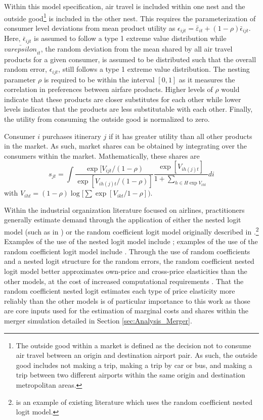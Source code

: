 \documentclass{article}
\begin{document}
    Within this model specification, air travel is included within one nest and the outside good\footnote{The outside good within a market is defined as the decision not to consume air travel between an origin and destination airport pair. As such, the outside good includes not making a trip, making a trip by car or bus, and making a trip between two different airports within the same origin and destination metropolitan areas.} is included in the other nest. This requires the parameterization of consumer level deviations from mean product utility as $\epsilon_{ijt} = \bar{\varepsilon}_{it} + (1-\rho) \bar{\epsilon}_{ijt}$. Here, $\bar{\epsilon}_{ijt}$ is assumed to follow a type 1 extreme value distribution while $\bar{varepsilon}_{it}$,  the random deviation from the mean shared by all air travel products for a given consumer, is assumed to be distributed such that the overall random error, $\epsilon_{ijt}$, still follows a type 1 extreme value distribution. The nesting parameter $\rho$ is required to be within the interval $[0,1]$ as it measures the correlation in preferences between airfare products. Higher levels of $\rho$ would indicate that these products are closer substitutes for each other while lower levels indicates that the products are less substitutable with each other. Finally, the utility from consuming the outside good is normalized to zero. 
	
	Consumer $i$ purchases itinerary $j$ if it has greater utility than all other products in the market. As such, market shares can be obtained by integrating over the consumers within the market. Mathematically, these shares are \[s_{jt} = \int \frac{\exp[V_{ijt} / (1-\rho)}{\exp [V_{i h(j) t} / (1 - \rho)]} \frac{\exp[V_{ih(j)t}]}{1 + \sum_{h \in H \exp V_{iht}}} d{{i}}\] with $V_{iht} = (1 - \rho) \log[\sum \exp[V_{ikt} / 1 - \rho])$. 

    Within the industrial organization literature focused on airlines, practitioners generally estimate demand through the application of either the nested logit model (such as in \citet{turner_access_2022,ciliberto_market_2021, aguirregabiria_dynamic_2012}) or the random coefficient logit model originally described in \citet{berry_automobile_1995}.\footnote{\citet{bet_market_2021} is an example of existing literature which uses the random coefficient nested logit model.} Examples of the use of the nested logit model include   \citet{turner_access_2022,ciliberto_market_2021, aguirregabiria_dynamic_2012}; examples of the use of the random coefficient logit model include \citet{ gayle_efficiency_2013, berry_tracing_2010}. Through the use of random coefficients and a nested logit structure for the random errors, the random coefficient nested logit model better approximates own-price and cross-price elasticities than the other models, at the cost of increased computational requirements \citep{grigolon_nested_2014}. That the random coefficient nested logit estimates each type of price elasticity more reliably than the other models is of particular importance to this work as those are core inputs used for the estimation of marginal costs and shares within the merger simulation detailed in Section \ref{sec:Analysis_Merger}. 
	
\end{document}

